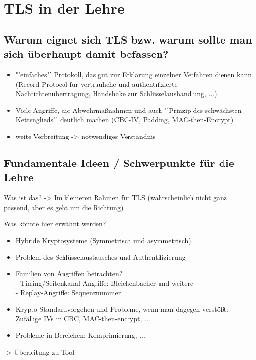 \chapter{TLS in der Lehre}

\section{Warum eignet sich TLS bzw. warum sollte man sich überhaupt damit befassen?}

\begin{mdframed}
\begin{itemize}
	\item "'einfaches"' Protokoll, das gut zur Erklärung einzelner Verfahren dienen kann (Record-Protocol für vertrauliche und authentifizierte Nachrichtenübertragung, Handshake zur Schlüsselaushandlung, ...)
	\item Viele Angriffe, die Abwehrmaßnahmen und auch "'Prinzip des schwächsten Kettenglieds"' deutlich machen (CBC-IV, Padding, MAC-then-Encrypt)
	\item weite Verbreitung -> notwendiges Verständnis
\end{itemize}
\end{mdframed}

\section{Fundamentale Ideen / Schwerpunkte für die Lehre}

\begin{mdframed}

Was ist das? -> Im kleineren Rahmen für TLS (wahrscheinlich nicht ganz passend, aber es geht um die Richtung)

Was könnte hier erwähnt werden?
\begin{itemize}
	\item Hybride Kryptosysteme (Symmetrisch und asymmetrisch)
	\item Problem des Schlüsselaustausches und Authentifizierung
	\item Familien von Angriffen betrachten?\\
	- Timing/Seitenkanal-Angriffe: Bleichenbacher und weitere\\
	- Replay-Angriffe: Sequenznummer
	\item Krypto-Standardvorgehen und Probleme, wenn man dagegen verstößt: Zufällige IVs in CBC, MAC-then-encrypt, ...
	\item Probleme in  Bereichen: Komprimierung, ...
\end{itemize}

-> Überleitung zu Tool

\end{mdframed}

